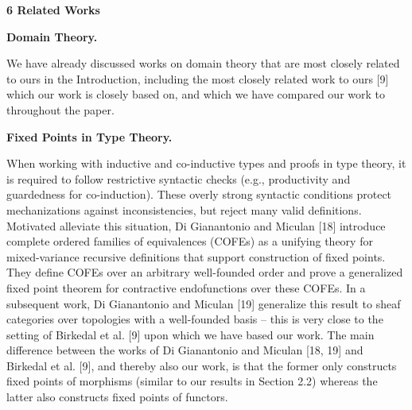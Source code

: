 
 


 
\par\medskip\noindent\textbf{6 Related Works}\par
 
 
\par\medskip\noindent\textbf{Domain Theory.}\par
 
 
We have already discussed works on domain theory that are most closely related to ours in the Introduction, including the most closely related work to ours [9] which our work is closely based on, and which we have compared our work to throughout the paper.\par
 
 
 
 
\par\medskip\noindent\textbf{Fixed Points in Type Theory.}\par
 
 
When working with inductive and co-inductive types and proofs in type theory, it is required to follow restrictive syntactic checks (e.g., productivity and guardedness for co-induction). These overly strong syntactic conditions protect mechanizations against inconsistencies, but reject many valid definitions. Motivated alleviate this situation, Di Gianantonio and Miculan [18] introduce complete ordered families of equivalences (COFEs) as a unifying theory for mixed-variance recursive definitions that support construction of fixed points. They define COFEs over an arbitrary well-founded order and prove a generalized fixed point theorem for contractive endofunctions over these COFEs. In a subsequent work, Di Gianantonio and Miculan [19] generalize this result to sheaf categories over topologies with a well-founded basis – this is very close to the setting of Birkedal et al. [9] upon which we have based our work. The main difference between the works of Di Gianantonio and Miculan [18, 19] and Birkedal et al. [9], and thereby also our work, is that the former only constructs fixed points of morphisms (similar to our results in Section 2.2) whereas the latter also constructs fixed points of functors.\par
 
